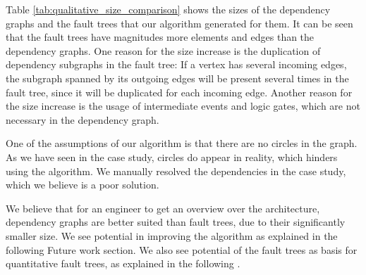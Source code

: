 Table \ref{tab:qualitative_size_comparison} shows the sizes of the dependency graphs and the fault trees that our algorithm generated for them. It can be seen that the fault trees have magnitudes more elements and edges than the dependency graphs. One reason for the size increase is the duplication of dependency subgraphs in the fault tree: If a vertex has several incoming edges, the subgraph spanned by its outgoing edges will be present several times in the fault tree, since it will be duplicated for each incoming edge. Another reason for the size increase is the usage of intermediate events and logic gates, which are not necessary in the dependency graph.


%

One of the assumptions of our algorithm is that there are no circles in the graph. As we have seen in the case study, circles do appear in reality, which hinders using the algorithm. We manually resolved the dependencies in the case study, which we believe is a poor solution.

We believe that for an engineer to get an overview over the architecture, dependency graphs are better suited than fault trees, due to their significantly smaller size. We see potential in improving the algorithm as explained in the following Future work section. We also see potential of the fault trees as basis for quantitative fault trees, as explained in the following .

\vfill\clearpage

